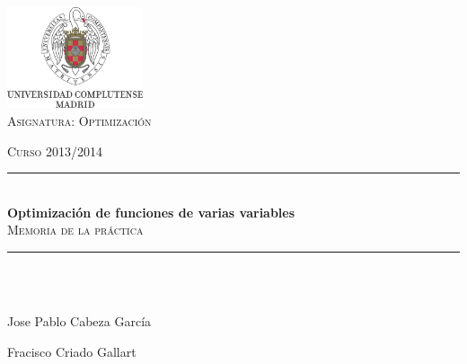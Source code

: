 \begin{titlepage}
  \begin{center}

    ~\\[3cm]
    \includegraphics[width=0.3\textwidth]{./Logo_UCM.jpg}
    ~\\[1cm]

    \textsc{\Large Asignatura: Optimización}
    
    \textsc{\small Curso 2013/2014} \\[0.5cm]
    

    \rule{0.8\linewidth}{0.5mm} \\[0.6cm]
    {\Large \bfseries Optimización de funciones de varias variables}
    \\[0.3cm] \textsc{\large Memoria de la práctica} 
    \\[0.4cm]

    \rule{0.8\linewidth}{0.5mm} \\[1.5cm]

    ~\\[3cm]
    \begin{flushright}
      {\large
      Jose Pablo Cabeza García
      
      Fracisco Criado Gallart
      }
    \end{flushright}

  \end{center}

\newpage
\mbox{}
\thispagestyle{empty}

\end{titlepage}
